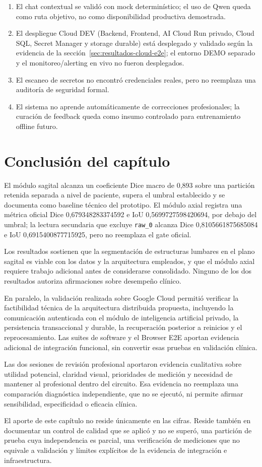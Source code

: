 \begin{enumerate}
    \item El chat contextual se validó con mock determinístico; el uso de Qwen queda como ruta objetivo, no como disponibilidad productiva demostrada.
    \item El despliegue Cloud DEV (Backend, Frontend, AI Cloud Run privado, Cloud SQL, Secret Manager y storage durable) está desplegado y validado según la evidencia de la sección~\ref{sec:resultados-cloud-e2e}; el entorno DEMO separado y el monitoreo/alerting en vivo no fueron desplegados.
    \item El escaneo de secretos no encontró credenciales reales, pero no reemplaza una auditoría de seguridad formal.
    \item El sistema no aprende automáticamente de correcciones profesionales; la curación de feedback queda como insumo controlado para entrenamiento offline futuro.
\end{enumerate}
\section{Conclusión del capítulo}

El módulo sagital alcanza un coeficiente Dice macro de 0,893 sobre una partición retenida separada a nivel de paciente, supera el umbral establecido y se documenta como baseline técnico del prototipo. El módulo axial registra una métrica oficial Dice 0,679348283374592 e IoU 0,5699727598420694, por debajo del umbral; la lectura secundaria que excluye \texttt{raw\_0} alcanza Dice 0,8105661875685084 e IoU 0,6915400877715925, pero no reemplaza el gate oficial.

Los resultados sostienen que la segmentación de estructuras lumbares en el plano sagital es viable con los datos y la arquitectura empleados, y que el módulo axial requiere trabajo adicional antes de considerarse consolidado. Ninguno de los dos resultados autoriza afirmaciones sobre desempeño clínico.

En paralelo, la validación realizada sobre Google Cloud permitió verificar la factibilidad técnica de la arquitectura distribuida propuesta, incluyendo la comunicación autenticada con el módulo de inteligencia artificial privado, la persistencia transaccional y durable, la recuperación posterior a reinicios y el reprocesamiento. Las suites de software y el Browser E2E aportan evidencia adicional de integración funcional, sin convertir esas pruebas en validación clínica.

Las dos sesiones de revisión profesional aportaron evidencia cualitativa sobre utilidad potencial, claridad visual, prioridades de medición y necesidad de mantener al profesional dentro del circuito. Esa evidencia no reemplaza una comparación diagnóstica independiente, que no se ejecutó, ni permite afirmar sensibilidad, especificidad o eficacia clínica.

El aporte de este capítulo no reside únicamente en las cifras. Reside también en documentar un control de calidad que se aplicó y no se superó, una partición de prueba cuya independencia es parcial, una verificación de mediciones que no equivale a validación y límites explícitos de la evidencia de integración e infraestructura.
